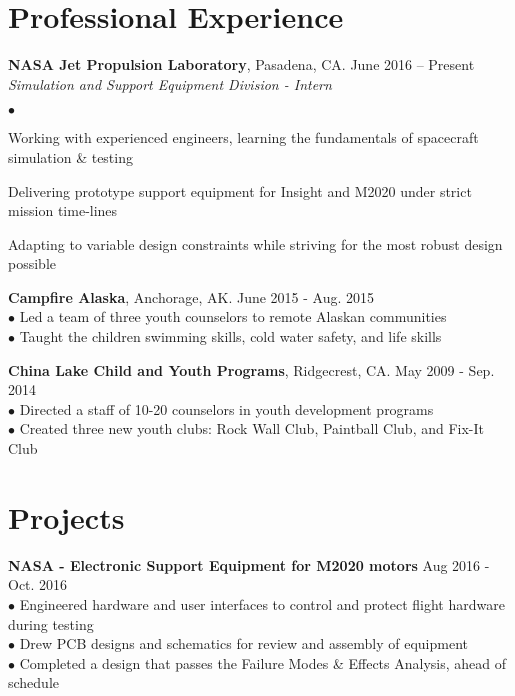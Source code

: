 \documentclass[margin,line]{res}
\newenvironment{list2}{
  \begin{list}{$\bullet$}{%
      \setlength{\itemsep}{0in}
      \setlength{\parsep}{0in} \setlength{\parskip}{0in}
      \setlength{\topsep}{0in} \setlength{\partopsep}{0in}
      \setlength{\leftmargin}{0.2in}}}{\end{list}}
\begin{document}
\begin{resume}
\section{\sc Professional Experience}
{\bf NASA Jet Propulsion Laboratory}, Pasadena, CA.  \hfill{June 2016 -- Present}\\
{\em Simulation and Support Equipment Division - Intern}
\begin{list2} %
\item Working with experienced engineers, learning the fundamentals of spacecraft simulation \& testing
\item Delivering prototype support equipment for Insight and M2020 under strict mission time-lines 
\item Adapting to variable design constraints while striving for the most robust design possible
\end{list2}


{\bf Campfire Alaska}, Anchorage, AK. \hfill{June 2015 - Aug. 2015}\\
$\bullet$ Led a team of three youth counselors to remote Alaskan communities \\
$\bullet$ Taught the children swimming skills, cold water safety, and life skills 



{\bf China Lake Child and Youth Programs}, Ridgecrest, CA. \hfill{May 2009 - Sep. 2014}\\
$\bullet$ Directed a staff of 10-20 counselors in youth development programs \\
$\bullet$ Created three new youth clubs: Rock Wall Club, Paintball Club, and Fix-It Club


\section{\sc Projects}
{\bf NASA - Electronic Support Equipment for M2020 motors} \hfill{Aug 2016 - Oct. 2016}\\
$\bullet$ Engineered hardware and user interfaces to control and protect flight hardware during testing \\
$\bullet$ Drew PCB designs and schematics for review and assembly of equipment \\
$\bullet$ Completed a design that passes the Failure Modes \& Effects Analysis, ahead of schedule


\end{resume}
\end{document}
